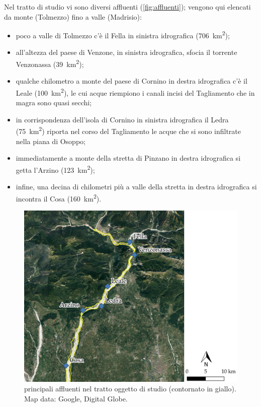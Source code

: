 Nel tratto di studio vi sono diversi affluenti (\vref{fig:affluenti}); vengono qui elencati da monte (Tolmezzo) fino a valle (Madrisio):
%
\begin{itemize}
	\item poco a valle di Tolmezzo c'è il Fella in sinistra idrografica (\SI{706}{\kilo\m\tothe{2}});
	\item all'altezza del paese di Venzone, in sinistra idrografica, sfocia il torrente Venzonassa (\SI{39}{\kilo\m\tothe{2}});
	\item qualche chilometro a monte del paese di Cornino in destra idrografica c'è il Leale (\SI{100}{\kilo\m\tothe{2}}), le cui acque riempiono i canali incisi del Tagliamento che in magra sono quasi secchi;
	\item in corrispondenza dell'isola di Cornino in sinistra idrografica il Ledra (\SI{75}{\kilo\m\tothe{2}}) riporta nel corso del Tagliamento le acque che si sono infiltrate nella piana di Osoppo;
	\item immediatamente a monte della stretta di Pinzano in destra idrografica si getta l'Arzino (\SI{123}{\kilo\m\tothe{2}});
	\item infine, una decina di chilometri più a valle della stretta in destra idrografica si incontra il Cosa (\SI{160}{\kilo\m\tothe{2}}).
\end{itemize}
%
\begin{figure}
	\centering
	\includegraphics[width=\textwidth]{files/overview_affluenti.jpeg}
	\caption[principali affluenti nel tratto oggetto di studio]{principali affluenti nel tratto oggetto di studio (contornato in giallo).
	\\
	Map data: Google, Digital Globe.}
	\label{fig:affluenti}
\end{figure}

